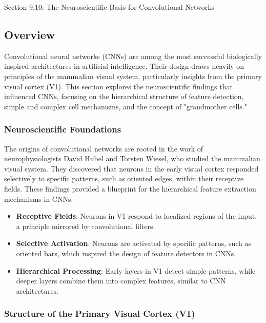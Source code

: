\begin{notes}{Section 9.10: The Neuroscientific Basis for Convolutional Networks}
    \subsection*{Overview}

    Convolutional neural networks (CNNs) are among the most successful biologically inspired architectures in artificial intelligence. Their design draws heavily on principles of the mammalian visual system, 
    particularly insights from the primary visual cortex (V1). This section explores the neuroscientific findings that influenced CNNs, focusing on the hierarchical structure of feature detection, simple 
    and complex cell mechanisms, and the concept of "grandmother cells."
    
    \subsubsection*{Neuroscientific Foundations}
    
    The origins of convolutional networks are rooted in the work of neurophysiologists David Hubel and Torsten Wiesel, who studied the mammalian visual system. They discovered that neurons in the early visual 
    cortex responded selectively to specific patterns, such as oriented edges, within their receptive fields. These findings provided a blueprint for the hierarchical feature extraction mechanisms in CNNs.
    
    \begin{highlight}
        \begin{itemize}
            \item \textbf{Receptive Fields}: Neurons in V1 respond to localized regions of the input, a principle mirrored by convolutional filters.
            \item \textbf{Selective Activation}: Neurons are activated by specific patterns, such as oriented bars, which inspired the design of feature detectors in CNNs.
            \item \textbf{Hierarchical Processing}: Early layers in V1 detect simple patterns, while deeper layers combine them into complex features, similar to CNN architectures.
        \end{itemize}
    \end{highlight}
    
    \subsubsection*{Structure of the Primary Visual Cortex (V1)}
    

\end{notes}

